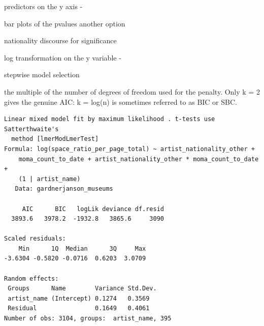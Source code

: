 \documentclass[
  letterpaper,
  DIV=11,
  numbers=noendperiod]{scrreprt}
\begin{document}
predictors on the y axis -

bar plots of the pvalues another option

nationality discourse for significance

log transformation on the y variable -

stepwise model selection

the multiple of the number of degrees of freedom used for the penalty.
Only k = 2 gives the genuine AIC: k = log(n) is sometimes referred to as
BIC or SBC.

\begin{verbatim}
Linear mixed model fit by maximum likelihood . t-tests use Satterthwaite's
  method [lmerModLmerTest]
Formula: log(space_ratio_per_page_total) ~ artist_nationality_other +  
    moma_count_to_date + artist_nationality_other * moma_count_to_date +  
    (1 | artist_name)
   Data: gardnerjanson_museums

     AIC      BIC   logLik deviance df.resid 
  3893.6   3978.2  -1932.8   3865.6     3090 

Scaled residuals: 
    Min      1Q  Median      3Q     Max 
-3.6304 -0.5820 -0.0716  0.6203  3.0709 

Random effects:
 Groups      Name        Variance Std.Dev.
 artist_name (Intercept) 0.1274   0.3569  
 Residual                0.1649   0.4061  
Number of obs: 3104, groups:  artist_name, 395


\end{verbatim}
\end{document}
